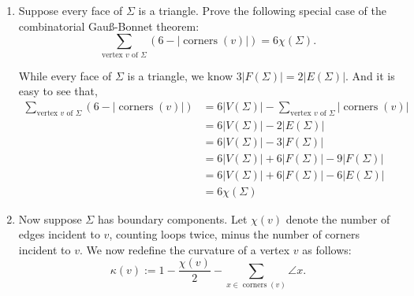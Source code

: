 \documentclass[11pt]{article}
\DeclareMathOperator{\corners}{corners}
\begin{document}
\begin{enumerate}
  \item
    Suppose every face of \(\Sigma\) is a triangle.
    Prove the following special case of the combinatorial Gau\ss-Bonnet theorem:
    \[ \sum_{\text{vertex \(v\) of \(\Sigma\)}}(6 - |\corners(v)|) = 6\chi(\Sigma). \]
    \begin{solution}
      While every face of \(\Sigma\) is a triangle, we know \(3|F(\Sigma)|=2|E(\Sigma)|\). And it is easy to see that,
      \begin{align*}
        \sum_{\text{vertex \(v\) of \(\Sigma\)}}(6 - |\corners(v)|) &= 6|V(\Sigma)| - \sum_{\text{vertex \(v\) of \(\Sigma\)}}|\corners(v)|\\
                                                            &=6|V(\Sigma)|-2|E(\Sigma)|\\
                                                            &=6|V(\Sigma)|-3|F(\Sigma)|\\
                                                            &=6|V(\Sigma)|+6|F(\Sigma)|-9|F(\Sigma)|\\
                                                            &=6|V(\Sigma)|+6|F(\Sigma)|-6|E(\Sigma)|\\
                                                            &=6\chi(\Sigma)
      \end{align*}
    \end{solution}
  \item
    Now suppose \(\Sigma\) has boundary components.
    Let \(\chi(v)\) denote the number of edges incident to \(v\), counting loops twice, minus the
    number of corners incident to \(v\).
    We now redefine the curvature of a vertex \(v\) as follows:
    \[ \kappa(v) := 1 - \frac{\chi(v)}{2} - \sum_{x \in \corners(v)} \angle x. \]


\end{enumerate}
\end{document}
